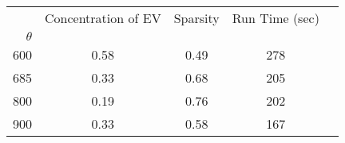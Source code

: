 \begin{tabular}{r|cccc}
\toprule
{} &  Concentration of EV &  Sparsity & Run Time (sec) \\
$\theta$ &                      &           &                \\
\midrule
600      &                 0.58 &      0.49 &            278 \\
685      &                 0.33 &      0.68 &            205 \\
800      &                 0.19 &      0.76 &            202 \\
900      &                 0.33 &      0.58 &            167 \\
\bottomrule
\end{tabular}
